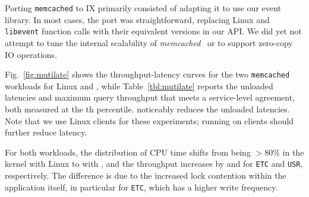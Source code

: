 Porting \texttt{memcached} to IX primarily consisted of adapting it to
use our event library. In most cases, the port was straightforward,
replacing Linux and \texttt{libevent} function calls with their
equivalent versions in our API. 
We did yet not attempt to tune the internal scalability of {\it
  memcached}~\cite{DBLP:conf/nsdi/FanAK13} or to support zero-copy IO operations.  




Fig.~\ref{fig:mutilate} shows the throughput-latency curves for the
two \texttt{memcached} workloads for Linux and \ix, while
Table~\ref{tbl:mutilate} reports the unloaded latencies and maximum
query throughput that meets a service-level agreement, both measured
at the th percentile.  \ix noticeably reduces the unloaded
latencies.  Note that we use Linux clients for these experiments;
running \ix on clients should further reduce latency.

For both workloads, the distribution of CPU time shifts from being
$>80\%$ in the kernel with Linux to  with \ix, and the
throughput increases by  and  for
\texttt{ETC} and \texttt{USR}, respectively.
The difference is due to
the increased lock contention within the application itself, in
particular for \texttt{ETC}, which has a higher write frequency.


%


